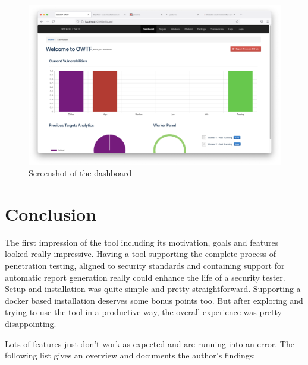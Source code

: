 \begin{figure}[H]
	\centering
	\includegraphics[width=12cm,keepaspectratio=true]{pictures/ui7.png}
	\caption{
		Screenshot of the dashboard
	}
	\label{fig:ui7}
\end{figure}

\newpage

\section{Conclusion}

The first impression of the tool including its motivation, goals and features looked really impressive. Having a tool supporting the complete process of penetration testing, aligned to security standards and containing support for automatic report generation really could enhance the life of a security tester. Setup and installation was quite simple and pretty straightforward. Supporting a docker based installation deserves some bonus points too.
But after exploring and trying to use the tool in a productive way, the overall experience was pretty disappointing.

Lots of features just don't work as expected and are running into an error. The following list gives an overview and documents the author's findings:

